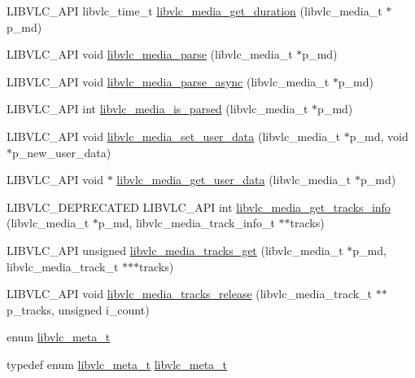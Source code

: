 \begin{DoxyCompactItemize}
\item 
L\+I\+B\+V\+L\+C\+\_\+\+A\+PI libvlc\+\_\+time\+\_\+t \hyperlink{group__libvlc__media_gadd2c47a0112a31e200a0145d0504873b}{libvlc\+\_\+media\+\_\+get\+\_\+duration} (libvlc\+\_\+media\+\_\+t $\ast$p\+\_\+md)
\item 
L\+I\+B\+V\+L\+C\+\_\+\+A\+PI void \hyperlink{group__libvlc__media_gad9e48150dcb1a066c51688f6e4a216f1}{libvlc\+\_\+media\+\_\+parse} (libvlc\+\_\+media\+\_\+t $\ast$p\+\_\+md)
\item 
L\+I\+B\+V\+L\+C\+\_\+\+A\+PI void \hyperlink{group__libvlc__media_gada166e6385518f9d5826c2dce647a475}{libvlc\+\_\+media\+\_\+parse\+\_\+async} (libvlc\+\_\+media\+\_\+t $\ast$p\+\_\+md)
\item 
L\+I\+B\+V\+L\+C\+\_\+\+A\+PI int \hyperlink{group__libvlc__media_ga9b8ce78027b0dadfa555fc33d2a033a6}{libvlc\+\_\+media\+\_\+is\+\_\+parsed} (libvlc\+\_\+media\+\_\+t $\ast$p\+\_\+md)
\item 
L\+I\+B\+V\+L\+C\+\_\+\+A\+PI void \hyperlink{group__libvlc__media_ga56dac0c5cb70b417ada18b2ebb9cd0e3}{libvlc\+\_\+media\+\_\+set\+\_\+user\+\_\+data} (libvlc\+\_\+media\+\_\+t $\ast$p\+\_\+md, void $\ast$p\+\_\+new\+\_\+user\+\_\+data)
\item 
L\+I\+B\+V\+L\+C\+\_\+\+A\+PI void $\ast$ \hyperlink{group__libvlc__media_ga1aa2355e48bbb47a7f8d7f1bb4a8101f}{libvlc\+\_\+media\+\_\+get\+\_\+user\+\_\+data} (libvlc\+\_\+media\+\_\+t $\ast$p\+\_\+md)
\item 
L\+I\+B\+V\+L\+C\+\_\+\+D\+E\+P\+R\+E\+C\+A\+T\+ED L\+I\+B\+V\+L\+C\+\_\+\+A\+PI int \hyperlink{group__libvlc__media_ga2102c151df0ab66d6158a80b7734f0f9}{libvlc\+\_\+media\+\_\+get\+\_\+tracks\+\_\+info} (libvlc\+\_\+media\+\_\+t $\ast$p\+\_\+md, libvlc\+\_\+media\+\_\+track\+\_\+info\+\_\+t $\ast$$\ast$tracks)
\item 
L\+I\+B\+V\+L\+C\+\_\+\+A\+PI unsigned \hyperlink{group__libvlc__media_ga33f5fef54e3750ab55744007e0e80f02}{libvlc\+\_\+media\+\_\+tracks\+\_\+get} (libvlc\+\_\+media\+\_\+t $\ast$p\+\_\+md, libvlc\+\_\+media\+\_\+track\+\_\+t $\ast$$\ast$$\ast$tracks)
\item 
L\+I\+B\+V\+L\+C\+\_\+\+A\+PI void \hyperlink{group__libvlc__media_ga9db98f62bb939cc49fbbd227d027850c}{libvlc\+\_\+media\+\_\+tracks\+\_\+release} (libvlc\+\_\+media\+\_\+track\+\_\+t $\ast$$\ast$p\+\_\+tracks, unsigned i\+\_\+count)
\end{DoxyCompactItemize}
\begin{DoxyCompactItemize}
\item 
enum \hyperlink{group__libvlc__media_ga90e7814a020f87d4c443d8d09b6dd4a0}{libvlc\+\_\+meta\+\_\+t} 
\item 
typedef enum \hyperlink{group__libvlc__media_ga90e7814a020f87d4c443d8d09b6dd4a0}{libvlc\+\_\+meta\+\_\+t} \hyperlink{group__libvlc__media_gada00e7231546f7af82a8e3f7bda01994}{libvlc\+\_\+meta\+\_\+t}
\end{DoxyCompactItemize}
